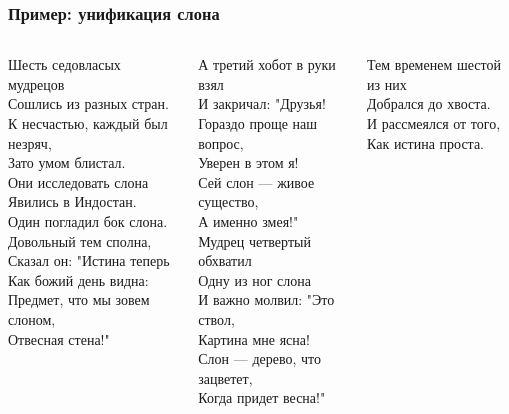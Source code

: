 \documentclass[xetex,mathserif,serif]{beamer}
\begin{document}
	\begin{frame}
		\frametitle{Пример: унификация слона}
		\begin{ssmall}
			\begin{columns}
				\begin{column}{0.33\textwidth}
					Шесть седовласых мудрецов \\
					Сошлись из разных стран. \\
					К несчастью, каждый был незряч, \\
					Зато умом блистал. \\
					Они исследовать слона \\
					Явились в Индостан. \\
					\vspace{5mm}
					Один погладил бок слона. \\
					Довольный тем сполна, \\
					Сказал он: "Истина теперь \\
					Как божий день видна: \\
					Предмет, что мы зовем слоном, ­\\
					Отвесная стена!" \\
				\end{column}
				\begin{column}{0.33\textwidth}
					А третий хобот в руки взял \\
					И закричал: "Друзья! \\
					Гораздо проще наш вопрос, \\
					Уверен в этом я! \\
					Сей слон --- живое существо, \\
					А именно змея!" \\
					\vspace{5mm}
					Мудрец четвертый обхватил \\
					Одну из ног слона \\
					И важно молвил: "Это ствол, \\
					Картина мне ясна! \\
					Слон --- дерево, что зацветет, \\
					Когда придет весна!" \\
				\end{column}
				\begin{column}{0.33\textwidth}
					Тем временем шестой из них \\
					Добрался до хвоста. \\
					И рассмеялся от того, \\
					Как истина проста. \\

\end{column}
\end{columns}
\end{ssmall}
\end{frame}
\end{document}
